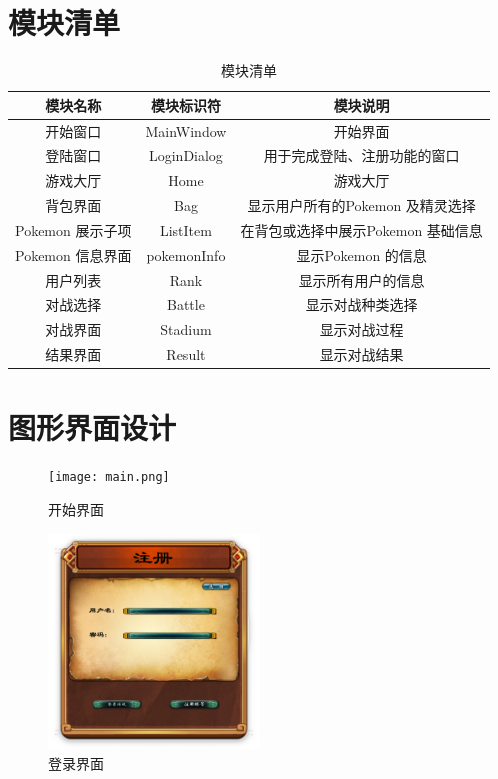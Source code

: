 \section{模块清单}
\begin{longtable}[c]{|c|c|c|}
    \caption{模块清单}                                         \\
    \hline
    \textbf{模块名称} & \textbf{模块标识符} & \textbf{模块说明}         \\ \hline
    \endfirsthead
    \endhead
    开始窗口          & MainWindow     & 开始界面                  \\ \hline
    登陆窗口          & LoginDialog    & 用于完成登陆、注册功能的窗口        \\ \hline
    游戏大厅          & Home           & 游戏大厅                  \\ \hline
    背包界面          & Bag            & 显示用户所有的Pokemon 及精灵选择  \\ \hline
    Pokemon 展示子项  & ListItem       & 在背包或选择中展示Pokemon 基础信息 \\ \hline
    Pokemon 信息界面  & pokemonInfo    & 显示Pokemon 的信息         \\ \hline
    用户列表          & Rank           & 显示所有用户的信息             \\ \hline
    对战选择          & Battle         & 显示对战种类选择              \\ \hline
    对战界面          & Stadium        & 显示对战过程                \\ \hline
    结果界面          & Result         & 显示对战结果                \\ \hline
\end{longtable}

\section{图形界面设计}

\begin{figure}[H]
    \centering
    \texttt{[image: main.png]}
    \caption{开始界面}
\end{figure}

\begin{figure}[H]
    \centering
    \includegraphics[width=0.5\textwidth]{login.png}
    \caption{登录界面}
\end{figure}

